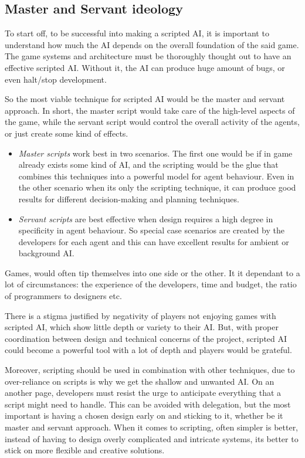 \documentclass[a4paper, 12pt]{book}
\begin{document}
\subsection{Master and Servant ideology}

To start off, to be successful into making a scripted AI, it is important to understand how much the AI depends on the overall foundation of the said game. The game systems and architecture must be thoroughly thought out to have an effective scripted AI. Without it, the AI can produce huge amount of bugs, or even halt/stop development.

So the most viable technique for scripted AI would be the master and servant approach. In short, the master script would take care of the high-level aspects of the game, while the servant script would control the overall activity of the agents, or just create some kind of effects.  

\begin{itemize}
    \item \emph{Master scripts} work best in two scenarios. The first one would be if in game already exists some kind of AI, and the scripting would be the glue that combines this techniques into a powerful model for agent behaviour. Even in the other scenario when its only the scripting technique, it can produce good results for different decision-making and planning techniques.
    \item \emph{Servant scripts} are best effective when design requires a high degree in specificity in agent behaviour. So special case scenarios are created by the developers for each agent and this can have excellent results for ambient or background AI.
\end{itemize}

Games, would often tip themselves into one side or the other. It it dependant to a lot of circumstances: the experience of the developers, time and budget, the ratio of programmers to designers etc.

There is a stigma justified by negativity of players not enjoying games with scripted AI, which show little depth or variety to their AI. But, with proper coordination between design and technical concerns of the project, scripted AI could become a powerful tool with a lot of depth and players would be grateful.

Moreover, scripting should be used in combination with other techniques, due to over-reliance on scripts is why we get the shallow and unwanted AI. On an another page, developers must resist the urge to anticipate everything that a script might need to handle. This can be avoided with delegation, but the most important is having a chosen design early on and sticking to it, whether be it master and servant approach. When it comes to scripting, often simpler is better, instead of having to design overly complicated and intricate systems, its better to stick on more flexible and creative solutions.
\end{document}
